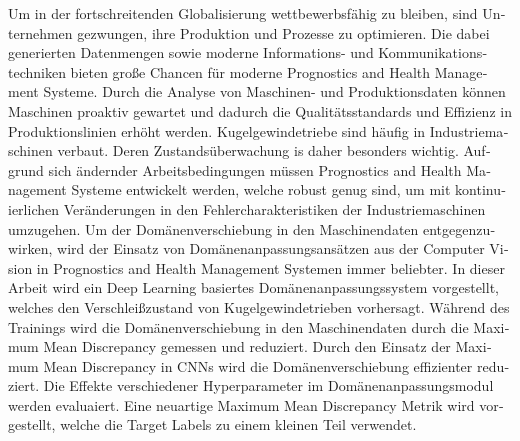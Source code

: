 \begin{otherlanguage}{ngerman} %
Um in der fortschreitenden Globalisierung wettbewerbsfähig zu bleiben, sind Unternehmen gezwungen, ihre Produktion und Prozesse zu optimieren. Die dabei generierten Datenmengen sowie moderne Informations- und Kommunikationstechniken bieten große Chancen für moderne Prognostics and Health Management Systeme. Durch die Analyse von Maschinen- und Produktionsdaten können Maschinen proaktiv gewartet und dadurch die Qualitätsstandards und Effizienz in Produktionslinien erhöht werden. Kugelgewindetriebe sind häufig in Industriemaschinen verbaut. Deren Zustandsüberwachung is daher besonders wichtig. Aufgrund sich ändernder Arbeitsbedingungen müssen Prognostics and Health Management Systeme entwickelt werden, welche robust genug sind, um mit kontinuierlichen Veränderungen in den Fehlercharakteristiken der Industriemaschinen umzugehen. Um der Domänenverschiebung in den Maschinendaten entgegenzuwirken, wird der Einsatz von Domänenanpassungsansätzen aus der Computer Vision in Prognostics and Health Management Systemen immer beliebter. In dieser Arbeit wird ein Deep Learning basiertes Domänenanpassungssystem vorgestellt, welches den Verschleißzustand von Kugelgewindetrieben vorhersagt. Während des Trainings wird die Domänenverschiebung in den Maschinendaten durch die Maximum Mean Discrepancy gemessen und reduziert. Durch den Einsatz der Maximum Mean Discrepancy in CNNs wird die Domänenverschiebung effizienter reduziert. Die Effekte verschiedener Hyperparameter im Domänenanpassungsmodul werden evaluaiert. Eine neuartige Maximum Mean Discrepancy Metrik wird vorgestellt, welche die Target Labels zu einem kleinen Teil verwendet.



\end{otherlanguage}


\makeatletter
{}
{\renewcommand{\abstractname}{Abstract}}
{\renewcommand{\abstractname}{Kurzfassung}}
\makeatother